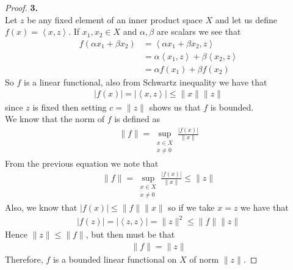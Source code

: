 \documentclass[11pt]{article}
\newcommand{\inprd}[1]{\left\langle{#1}\right\rangle}
\theoremstyle{definition}
\begin{document}
\cleardoublepage
\begin{proof}{\textbf{3.}}\\
Let $z$ be any fixed element of an inner product space $X$ and let us define
$f(x) = \inprd{x, z}$. If $x_1, x_2 \in X$ and $\alpha, \beta$ are scalars
we see that
\begin{align*}
    f(\alpha x_1 + \beta x_2) &= \inprd{\alpha x_1 + \beta x_2, z} \\
    &= \alpha\inprd{x_1, z} + \beta\inprd{x_2, z}\\
    &= \alpha f(x_1) + \beta f(x_2)
\end{align*}
So $f$ is a linear functional, also from Schwartz inequality we have that
\begin{align*}
    |f(x)| = |\inprd{x,z}| \leq \|x\| \|z\|
\end{align*}
since $z$ is fixed then setting $c = \|z\|$ shows us that $f$ is bounded.\\
We know that the norm of $f$ is defined as 
\begin{align*}
    \|f\| = \sup_{\substack{x \in X \\ x \neq 0}} \frac{|f(x)|}{\|x\|}
\end{align*}
From the previous equation we note that
\begin{align*}
    \|f\| = \sup_{\substack{x \in X \\ x \neq 0}} \frac{|f(x)|}{\|x\|}
    \leq \|z\|
\end{align*}
Also, we know that $|f(x)| \leq \|f\|\|x\|$ so if we take $x = z$
we have that
\begin{align*}
    |f(z)| = |\inprd{z,z}| = \|z\|^2 \leq \|f\|\|z\|
\end{align*}
Hence $\|z\| \leq \|f\|$, but then must be that
\begin{align*}
    \|f\| = \|z\|
\end{align*}
Therefore, $f$ is a bounded linear functional on $X$ of norm $\|z\|$.
\end{proof}
\end{document}

